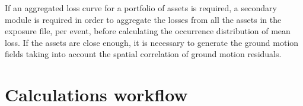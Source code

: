 \par
 
If an aggregated loss curve for a portfolio of assets is required, a secondary module is required in order to aggregate the losses from all the assets in the exposure file, per event, before calculating the occurrence distribution of mean loss. If the assets are close enough, it is necessary to generate the ground motion fields taking into account the spatial correlation of ground motion residuals. 

\section{Calculations workflow}



